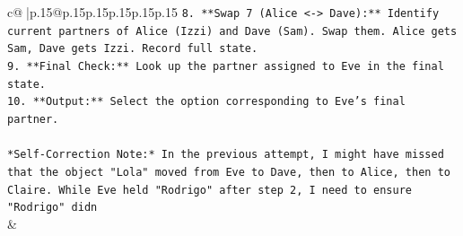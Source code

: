 \documentclass{article}
\begin{document}
{\begin{supertabular}{c@{$\;$}|p{.15\linewidth}@{}p{.15\linewidth}p{.15\linewidth}p{.15\linewidth}p{.15\linewidth}p{.15\linewidth}}
{{{\texttt{8.  **Swap 7 (Alice <{-}> Dave):** Identify current partners of Alice (Izzi) and Dave (Sam). Swap them. Alice gets Sam, Dave gets Izzi. Record full state.} \\
\texttt{9.  **Final Check:** Look up the partner assigned to Eve in the final state.} \\
\texttt{10. **Output:** Select the option corresponding to Eve's final partner.} \\
\\ 
\texttt{*Self{-}Correction Note:* In the previous attempt, I might have missed that the object "Lola" moved from Eve to Dave, then to Alice, then to Claire. While Eve held "Rodrigo" after step 2, I need to ensure "Rodrigo" didn} \\
            }
        }
    }
    & \\ \\

\end{supertabular}
}
\end{document}
